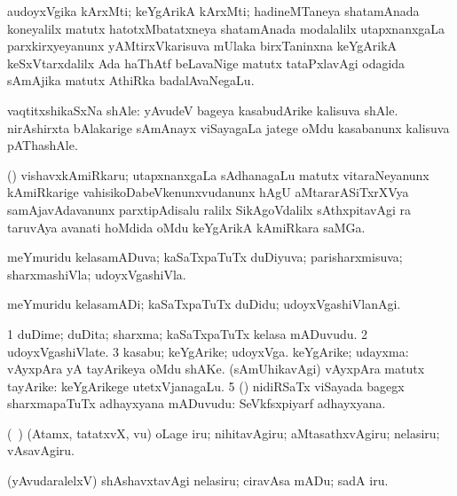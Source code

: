 \bentry
{}
\gl{\nA}
\bmng
audoyxVgika kArxMti; keYgArikA kArxMti; hadineMTaneya shatamAnada koneyalilx matutx hatotxMbatatxneya shatamAnada modalalilx utapxnanxgaLa parxkirxyeyanunx yAMtirxVkarisuva mUlaka birxTaninxna keYgArikA keSxVtarxdalilx Ada haThAtf beLavaNige matutx tataPxlavAgi odagida sAmAjika matutx AthiRka badalAvaNegaLu. 
\emng
\eentry

\bentry
{}
\gl{\nA}
\bmng
vaqtitxshikaSxNa shAle: 
\banum
{} yAvudeV bageya kasabudArike kalisuva shAle. 
 nirAshirxta bAlakarige sAmAnayx viSayagaLa jatege oMdu kasabanunx kalisuva pAThashAle. 
\eanum
\emng
\eentry

\bentry
{}
\gl{\nA}
\bmng
(\bava) vishavxkAmiRkaru; utapxnanxgaLa sAdhanagaLu matutx vitaraNeyanunx kAmiRkarige vahisikoDabeVkenunxvudanunx hAgU aMtararASiTxrXVya samAjavAdavanunx parxtipAdisalu ralilx SikAgoVdalilx sAthxpitavAgi ra taruvAya avanati hoMdida oMdu keYgArikA kAmiRkara saMGa. 
\emng
\eentry

\bentry
{}
\gl{\gu}
\bmng
meYmuridu kelasamADuva; kaSaTxpaTuTx duDiyuva; parisharxmisuva; sharxmashiVla; udoyxVgashiVla. 
\emng
\eentry

\bentry
{}
\gl{\kirxvi}
\bmng
meYmuridu kelasamADi; kaSaTxpaTuTx duDidu; udoyxVgashiVlanAgi. 
\emng
\eentry

\bentry
{}
\gl{\nA}
\bmng
\bnum
\num{1} duDime; duDita; sharxma; kaSaTxpaTuTx kelasa mADuvudu. 
\num{2} udoyxVgashiVlate. 
\num{3} kasabu; keYgArike; udoyxVga. 
 keYgArike; udayxma: 
\banum
{} vAyxpAra yA tayArikeya oMdu shAKe. 
 (sAmUhikavAgi) vAyxpAra matutx tayArike:  keYgArikege utetxVjanagaLu. 
\eanum
\numie
\num{5} (\AmA) nidiRSaTx viSayada bagegx sharxmapaTuTx adhayxyana mADuvudu:  SeVkfsxpiyarf adhayxyana. 
\enum
\emng
\eentry

\bentry
{}
\gl{\kirx}
\bmng
\emng

\noindent
\gl{\sakirx}
\bmng
(\sA\ \rUpa) (Atamx, tatatxvX, \mo vu) oLage iru; nihitavAgiru; aMtasathxvAgiru; nelasiru; vAsavAgiru. 
\emng

\noindent
\gl{\akirx}
\bmng
(yAvudaralelxV) shAshavxtavAgi nelasiru; ciravAsa mADu; sadA iru. 
\emng
\eentry

